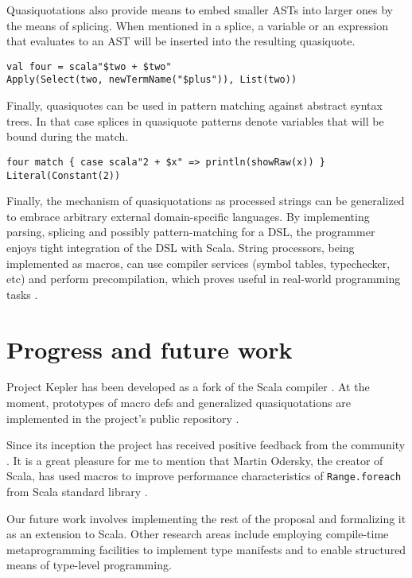 \documentclass{llncs}
\begin{document}
Quasiquotations also provide means to embed smaller ASTs into larger ones by the means of splicing.
When mentioned in a splice, a variable or an expression that evaluates to an AST will be inserted into the resulting quasiquote.

\noindent
\begin{verbatim}
val four = scala"$two + $two"
Apply(Select(two, newTermName("$plus")), List(two))
\end{verbatim}
\noindent

Finally, quasiquotes can be used in pattern matching against abstract syntax trees.
In that case splices in quasiquote patterns denote variables that will be bound during the match.

\noindent
\begin{verbatim}
four match { case scala"2 + $x" => println(showRaw(x)) }
Literal(Constant(2))
\end{verbatim}
\noindent

Finally, the mechanism of quasiquotations as processed strings can be generalized to embrace arbitrary external domain-specific languages.
By implementing parsing, splicing and possibly pattern-matching for a DSL, the programmer enjoys tight integration of the DSL with Scala.
String processors, being implemented as macros, can use compiler services (symbol tables, typechecker, etc) and perform precompilation,
which proves useful in real-world programming tasks \cite{mainland07}.

\section{Progress and future work}

Project Kepler has been developed as a fork of the Scala compiler \cite{scala12}.
At the moment, prototypes of macro defs and generalized quasiquotations are implemented in the project's public repository \cite{kepler12b}.

Since its inception the project has received positive feedback from the community \cite{scalauser11}.
It is a great pleasure for me to mention that Martin Odersky, the creator of Scala, has used macros to improve performance characteristics of \texttt{Range.foreach}
from Scala standard library \cite{odersky12}.

Our future work involves implementing the rest of the proposal and formalizing it as an extension to Scala.
Other research areas include employing compile-time metaprogramming facilities to implement type manifests \cite{dubochet11}
and to enable structured means of type-level programming.
\end{document}
